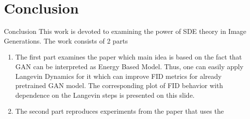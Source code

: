 \documentclass[xcolor=dvipsnames]{beamer}
\begin{document}
    \section{Conclusion}
    \begin{frame}{Conclusion}
        This work is devoted to examining the power of SDE theory in Image Generations.
        The work consists of 2 parts
        \begin{enumerate}
            \item The first part examines the paper which main idea is based on the fact
            that GAN can be interpreted as Energy Based Model. Thus, one can easily
            apply Langevin Dynamics for it which can improve FID metrics for already pretrained 
            GAN model. The corresponding plot of FID behavior with dependence on  
            the Langevin steps is presented on this slide.
            \item The second part reproduces experiments from the paper that uses the  
        \end{enumerate}
    \end{frame}
    
\end{document}

